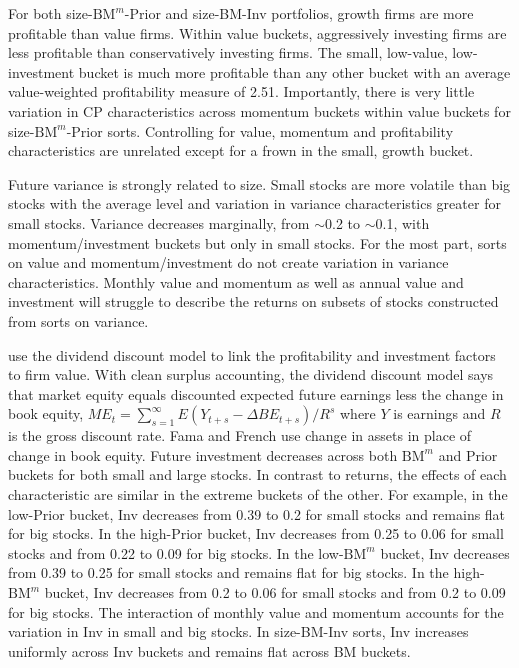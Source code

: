 For both size-$\text{BM}^m$-Prior and size-BM-Inv portfolios,
growth firms are more profitable than value firms.
Within value buckets, aggressively investing firms are less profitable than
conservatively investing firms.
The small, low-value, low-investment bucket is much more profitable than any
other bucket with an average value-weighted profitability measure of 2.51.
Importantly, there is very little variation in CP characteristics across
momentum buckets within value buckets for size-$\text{BM}^m$-Prior sorts.
Controlling for value, momentum and profitability characteristics are unrelated
except for a frown in the small, growth bucket.

Future variance is strongly related to size. Small stocks are more volatile
than big stocks with the average level and variation in variance
characteristics greater for small stocks. Variance decreases marginally, from
$\sim$0.2 to $\sim$0.1, with momentum/investment buckets but only in small
stocks. For the most part, sorts on value and momentum/investment do not create
variation in variance characteristics. Monthly value and momentum as well as
annual value and investment will struggle to describe the returns on subsets of
stocks constructed from sorts on variance.

\textcite{fama2006profitability} use the dividend discount model to link the
profitability and investment factors to firm value.
With clean surplus accounting, the dividend discount model says that market
equity equals discounted expected future earnings less the change in book
equity,
$ME_t = \sum_{s=1}^\infty E(Y_{t+s}-\Delta BE_{t+s})/R^s$
where $Y$ is earnings and $R$ is the gross discount rate.
Fama and French use change in assets in place of change in book equity.
Future investment decreases across both $\text{BM}^m$ and Prior buckets for
both small and large stocks. In contrast to returns, the effects of each
characteristic are similar in the extreme buckets of the other. For example, in
the low-Prior bucket, Inv decreases from 0.39 to 0.2 for small stocks and
remains flat for big stocks. In the high-Prior bucket, Inv decreases from 0.25
to 0.06 for small stocks and from 0.22 to 0.09 for big stocks. In the
low-$\text{BM}^m$ bucket, Inv decreases from 0.39 to 0.25 for small stocks and
remains flat for big stocks. In the high-$\text{BM}^m$ bucket, Inv decreases
from 0.2 to 0.06 for small stocks and from 0.2 to 0.09 for big stocks. The
interaction of monthly value and momentum accounts for the variation in Inv in
small and big stocks. In size-BM-Inv sorts, Inv increases uniformly across Inv
buckets and remains flat across BM buckets.

